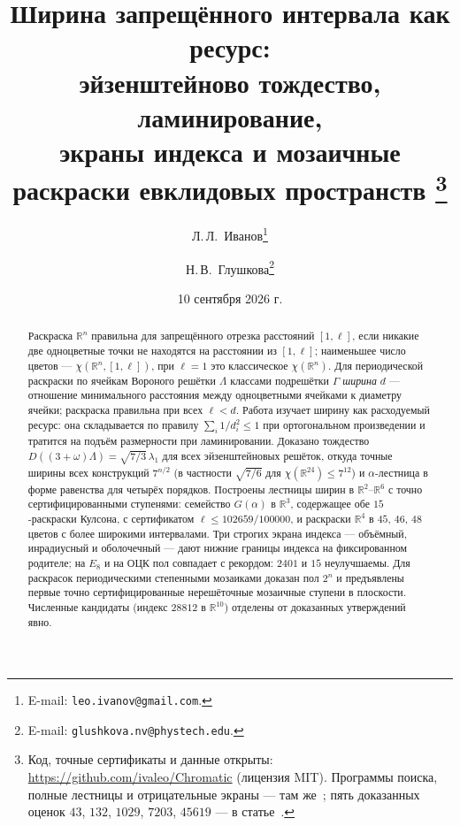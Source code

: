 \documentclass[11pt]{article}
\title{\bfseries Ширина запрещённого интервала как ресурс:\\
эйзенштейново тождество, ламинирование,\\
экраны индекса и мозаичные раскраски евклидовых пространств%
\thanks{Код, точные сертификаты и данные открыты:
\url{https://github.com/ivaleo/Chromatic} (лицензия MIT).
Программы поиска, полные лестницы и отрицательные экраны --- там
же~\cite{Repo}; пять
доказанных оценок $43$, $132$, $1029$, $7203$, $45619$ --- в
статье~\cite{Bounds}.}}
\author{Л.\,Л.~Иванов\thanks{E-mail: \texttt{leo.ivanov@gmail.com}.}
  \and Н.\,В.~Глушкова\thanks{E-mail: \texttt{glushkova.nv@phystech.edu}.}}
\date{10 сентября 2026 г.}
\theoremstyle{definition}
\theoremstyle{remark}
\newcommand{\R}{\mathbb{R}}
\begin{document}
\maketitle

\begin{abstract}
\noindent
Раскраска $\R^n$ правильна для запрещённого отрезка расстояний $[1,\ell]$, если
никакие две одноцветные точки не находятся на расстоянии из $[1,\ell]$;
наименьшее число цветов --- $\chi(\R^n,[1,\ell])$, при $\ell=1$ это
классическое $\chi(\R^n)$. Для периодической раскраски по ячейкам Вороного
решётки $\Lambda$ классами подрешётки $\Gamma$ \emph{ширина} $d$ --- отношение
минимального расстояния между одноцветными ячейками к диаметру ячейки; раскраска
правильна при всех $\ell<d$. Работа изучает ширину как расходуемый ресурс: она
складывается по правилу $\sum_i1/d_i^2\le1$ при ортогональном произведении и
тратится на подъём размерности при ламинировании. Доказано тождество
$D((3+\omega)\Lambda)=\sqrt{7/3}\,\lambda_1$ для всех эйзенштейновых решёток,
откуда точные ширины всех конструкций $7^{n/2}$ (в частности $\sqrt{7/6}$ для
$\chi(\R^{24})\le7^{12}$) и $\alpha$-лестница в форме равенства для четырёх
порядков. Построены лестницы ширин в $\R^2$--$\R^6$ с точно
сертифицированными ступенями: семейство
$G(\alpha)$ в $\R^3$, содержащее обе $15$-раскраски Кулсона, с сертификатом
$\ell\le102659/100000$, и раскраски $\R^4$ в $45$, $46$, $48$ цветов с более
широкими интервалами. Три строгих экрана индекса --- объёмный, инрадиусный и
оболочечный --- дают нижние границы индекса на фиксированном родителе; на $E_8$
и на ОЦК пол совпадает с рекордом: $2401$ и $15$ неулучшаемы. Для раскрасок
периодическими степенными мозаиками доказан пол $2^n$ и предъявлены первые
точно сертифицированные нерешёточные мозаичные ступени в плоскости. Численные
кандидаты (индекс $28812$ в $\R^{10}$) отделены от доказанных утверждений
явно.
\end{abstract}
\end{document}
